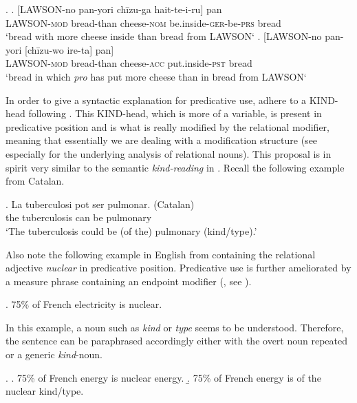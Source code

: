 \documentclass [output=book,colorlinks,citecolor=brown]{langscibook}
\begin{document}
\ex. \ag. [LAWSON-no pan-yori chīzu-ga hait-te-i-ru] pan\\
LAWSON-\textsc{mod} bread-than cheese-\textsc{nom} be.inside-\textsc{ger}-be-\textsc{prs} bread\\
`bread with more cheese inside than bread from LAWSON‘
\bg. [LAWSON-no pan-yori [chīzu-wo ire-ta] pan]\\
LAWSON-\textsc{mod} bread-than cheese-\textsc{acc} put.inside-\textsc{pst} bread\\
`bread in which \textit{pro} has put more cheese than in bread from LAWSON‘

In order to give a syntactic explanation for predicative use, \citet{shimada:2018:relational} adhere to a KIND-head following \citet{adger:2013:syntax}. This KIND-head, which is more of a variable, is present in predicative position and is what is really modified by the relational modifier, meaning that essentially we are dealing with a modification structure (see especially \citealt[ch. 4]{adger:2013:syntax} for the underlying analysis of relational nouns). This proposal is in spirit very similar to the semantic \textit{kind-reading} in \citet{mcnally:2004:relational}. Recall the following example from Catalan. %

\exg. La tuberculosi pot ser pulmonar. (Catalan)\\
the tuberculosis can be pulmonary\\
`The tuberculosis could be (of the) pulmonary (kind/type).’ \\ \null \hfill \citep[189]{mcnally:2004:relational}

Also note the following example in English from \citet{bauer:2013:oxford} containing the relational adjective \textit{nuclear} in predicative position. Predicative use is further ameliorated by a measure phrase containing an endpoint modifier (\citealt{fabregas:2014:adjectival}, see \citealt[80]{shimada:2018:relational}).

\ex. 75\% of French electricity is nuclear. \hfill \citep[318]{bauer:2013:oxford}

In this example, a noun such as \textit{kind} or \textit{type} seems to be understood. Therefore, the sentence can be paraphrased accordingly either with the overt noun repeated or a generic \textit{kind}-noun.

\ex. \a. 75\% of French energy is nuclear energy.
\b. 75\% of French energy is of the nuclear kind/type.
\end{document}
